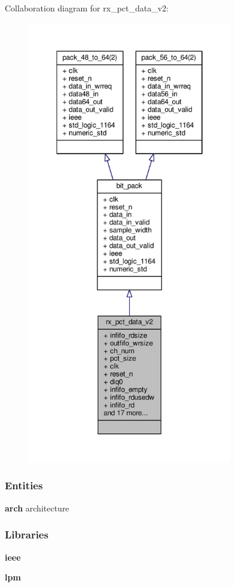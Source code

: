 Collaboration diagram for rx\+\_\+pct\+\_\+data\+\_\+v2\+:\nopagebreak
\begin{figure}[H]
\begin{center}
\leavevmode
\includegraphics[height=550pt]{d4/dcf/classrx__pct__data__v2__coll__graph}
\end{center}
\end{figure}
\subsubsection*{Entities}
\begin{DoxyCompactItemize}
\item 
{\bf arch} architecture
\end{DoxyCompactItemize}
\subsubsection*{Libraries}
 \begin{DoxyCompactItemize}
\item 
{\bf ieee} 
\item 
{\bf lpm} 
\end{DoxyCompactItemize}
